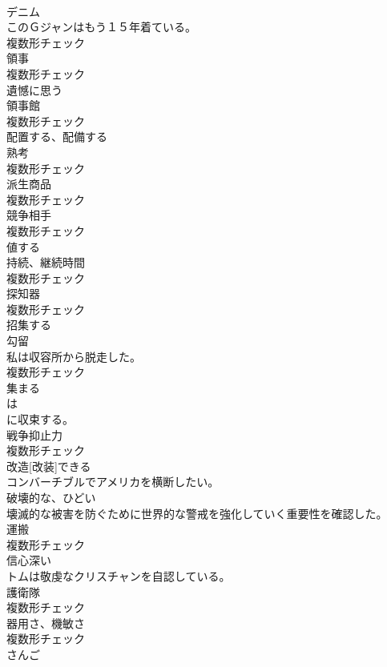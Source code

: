 \documentclass[8pt]{extreport}
\begin{document}
\begin{CJK}{UTF8}{min}
\\	[名詞]	デニム	
\\	このＧジャンはもう１５年着ている。	
\\	複数形チェック
\\	[名詞]	領事	
\\	複数形チェック
\\	[動詞]	遺憾に思う	
\\	[名詞]	領事館	
\\	複数形チェック
\\	[動詞]	配置する、配備する	
\\	[名詞]	熟考	
\\	複数形チェック
\\	[名詞]	派生商品	
\\	複数形チェック
\\	[名詞]	競争相手	
\\	複数形チェック
\\	[形容詞]	値する	
\\	[名詞]	持続、継続時間	
\\	複数形チェック
\\	[名詞]	探知器	
\\	複数形チェック
\\	[動詞]	招集する	
\\	[名詞]	勾留	
\\	私は収容所から脱走した。	
\\	複数形チェック
\\	[動詞]	集まる	
\\	は
\\	に収束する。	
\\	[名詞]	戦争抑止力	
\\	複数形チェック
\\	[形容詞]	改造[改装]できる	
\\	コンバーチブルでアメリカを横断したい。	
\\	[形容詞]	破壊的な、ひどい	
\\	壊滅的な被害を防ぐために世界的な警戒を強化していく重要性を確認した。	
\\	[名詞]	運搬	
\\	複数形チェック
\\	[形容詞]	信心深い	
\\	トムは敬虔なクリスチャンを自認している。	
\\	[名詞]	護衛隊	
\\	複数形チェック
\\	[名詞]	器用さ、機敏さ	
\\	複数形チェック
\\	[名詞]	さんご	

\end{CJK}
\end{document}
